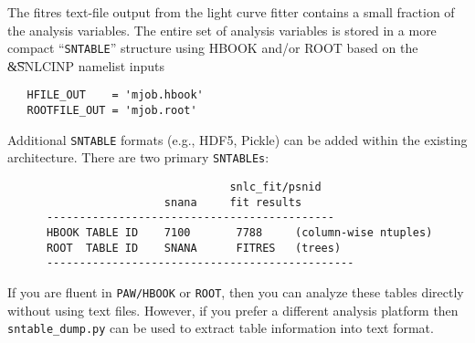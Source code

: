 \documentclass[12pt]{article}
\newcommand{\sndump}{{\tt sntable\_dump.py}}
\begin{document}
{The fitres text-file output from the light curve fitter
contains a small fraction of the analysis variables.
The entire set of analysis variables is stored in a more
compact ``{\tt SNTABLE}'' structure using HBOOK and/or ROOT
based on the {\t\&SNLCINP} namelist inputs 
\begin{verbatim}
   HFILE_OUT    = 'mjob.hbook'
   ROOTFILE_OUT = 'mjob.root'
\end{verbatim} 
%
Additional {\tt SNTABLE} formats (e.g., HDF5, Pickle)
can be added within the existing architecture.
There are two primary {\tt SNTABLEs}:
%
\begin{verbatim}
                                  snlc_fit/psnid
                        snana     fit results
      --------------------------------------------
      HBOOK TABLE ID    7100       7788     (column-wise ntuples)
      ROOT  TABLE ID    SNANA      FITRES   (trees)
      -----------------------------------------------
\end{verbatim} 
%
If you are fluent in {\tt PAW/HBOOK} or {\tt ROOT},
then you can analyze these tables directly without
using text files. However, if you prefer a different
analysis platform then {\sndump} can be used to
extract table information into text format.

}
\end{document}
